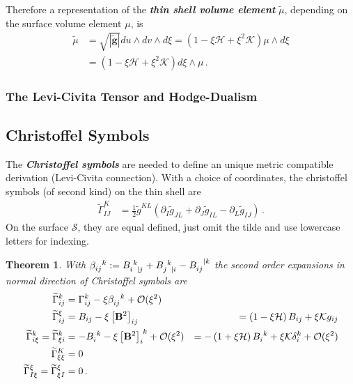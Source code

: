 \documentclass[a4paper,11pt]{scrartcl}
\newcommand{\surf}{\mathcal{S}}
\newcommand{\landau}{\mathcal{O}}
\newcommand{\gb}{\mathbf{g}}
\newcommand{\tgb}{\tilde{\gb}}
\newcommand{\tg}{\tilde{g}}
\newcommand{\Bb}{\mathbf{B}}
\newcommand{\tch}[2]{\widetilde{\Gamma}_{#1}^{#2}}
\newcommand{\ch}[2]{\Gamma_{#1}^{#2}}
\newcommand{\meanc}{\mathcal{H}}
\newcommand{\gaussc}{\mathcal{K}}
\newcommand{\formPeriod}{\,\text{.}}
\newcommand{\newterm}[1]{\textbf{\textit{#1}}}
\newtheorem{theorem}{Theorem}
\begin{document}
  Therefore a representation of the \newterm{thin shell volume element} \( \tilde{\mu} \), depending on the surface volume element \( \mu \), is
  \begin{align}
    \tilde{\mu} &= \sqrt{\left| \tgb \right|} du\wedge dv \wedge d\xi
            = \left(  1 - \xi\meanc + \xi^{2}\gaussc\right)  \mu \wedge d\xi \\
                &= \left(  1 - \xi\meanc + \xi^{2}\gaussc\right)  d\xi \wedge \mu \formPeriod
  \end{align}

\subsubsection{The Levi-Civita Tensor and Hodge-Dualism}

\subsection{Christoffel Symbols}
  The \newterm{Christoffel symbols} are needed to define an unique metric compatible derivation (Levi-Civita connection).
  With a choice of coordinates, the christoffel symbols (of second kind) on the thin shell are
  \begin{align}
    \tch{IJ}{K} &= \frac{1}{2} \tg^{KL}\left( \partial_{I}\tg_{JL} + \partial_{J}\tg_{IL} - \partial_{L}\tg_{IJ} \right)\formPeriod
  \end{align}
  On the surface \( \surf \), they are equal defined, just omit the tilde and use lowercase letters for indexing.
  \begin{theorem}
    With \( \tensor{\beta}{_{ij}^{k}} := \tensor{B}{_{i}^{k}_{|j}} +  \tensor{B}{_{j}^{k}_{|i}} - \tensor{B}{_{ij}^{|k}}\)
    the second order expansions in normal direction of Christoffel symbols are
    \begin{align}
      \tch{ij}{k} &= \ch{ij}{k} - \xi\tensor{\beta}{_{ij}^{k}} + \landau(\xi^{2})\\
      \tch{ij}{\xi} &= B_{ij} - \xi \left[ \Bb^{2} \right]_{ij} 
                          &= \left( 1 - \xi\meanc \right)B_{ij} + \xi\gaussc g_{ij}\\
      \tch{i\xi}{k} = \tch{\xi i}{k} &= -\tensor{B}{_{i}^{k}} - \xi\tensor{\left[ \Bb^{2} \right]}{_{i}^{k}} + \landau(\xi^{2})
                                        &= -\left( 1 + \xi\meanc \right)\tensor{B}{_{i}^{k}} + \xi\gaussc\delta_{i}^{k} + \landau(\xi^{2})\\
      \tch{\xi\xi}{K} &= 0 \\
      \tch{I\xi}{\xi} = \tch{\xi I}{\xi} &= 0 \formPeriod
    \end{align}
  \end{theorem}
\end{document}
